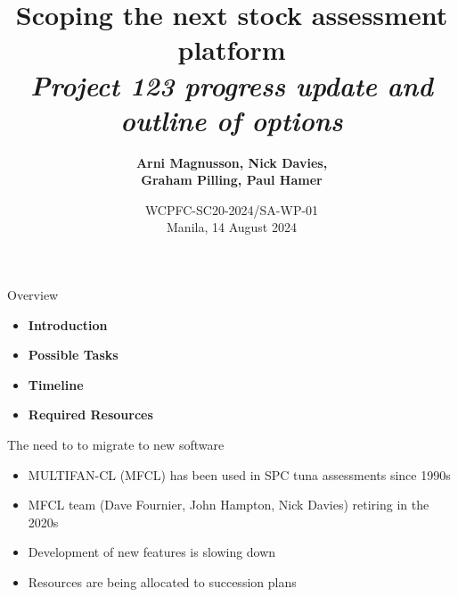 \documentclass[aspectratio=169,fleqn]{beamer}
\begin{document}
\begin{frame}
  \title{\vspace{-5ex}\darkblue Scoping the next stock assessment
    platform\\[2ex]
    \it\large\darkgray
    Project 123 progress update and outline of options}
  \author{\vspace{-10ex}\darkgray\bf
    Arni Magnusson, Nick Davies,\\[0.5ex]
    Graham Pilling, Paul Hamer}
  \date{\darkgreen WCPFC-SC20-2024/SA-WP-01\\[0.5ex]
    Manila, 14 August 2024}
  \titlepage
\end{frame}


\begin{frame}{Overview}
  \begin{itemize}
    \item[] {\bf\darkblue Introduction} \\[5ex]
    \item[] {\bf\darkblue Possible Tasks} \\[5ex]
    \item[] {\bf\darkblue Timeline} \\[5ex]
    \item[] {\bf\darkblue Required Resources} \\[1ex]
  \end{itemize}
\end{frame}


\begin{frame}{The need to to migrate to new software}
  \begin{itemize}
    \item[] MULTIFAN-CL (MFCL) has been used in SPC tuna assessments since
    1990s\\[4ex]
    \item[] MFCL team (Dave Fournier, John Hampton, Nick Davies) retiring in the
    2020s\\[4ex]
    \item[] Development of new features is slowing down\\[4ex]
    \item[] Resources are being allocated to succession plans\\[2ex]
  \end{itemize}
\end{frame}
\end{document}
